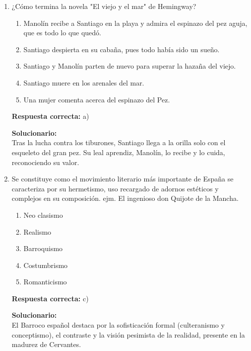 \begin{enumerate}
	\item ¿Cómo termina la novela "El viejo y el mar" de Hemingway?
	\begin{enumerate}[label=\alph*)]
		\item Manolín recibe a Santiago en la playa y admira el espinazo del pez aguja, que es todo lo que quedó.
		\item Santiago despierta en su cabaña, pues todo había sido un sueño.
		\item Santiago y Manolín parten de nuevo para superar la hazaña del viejo.
		\item Santiago muere en los arenales del mar.
		\item Una mujer comenta acerca del espinazo del Pez.
	\end{enumerate}
	\textbf{Respuesta correcta:} a)
	
	\vspace{2mm}
	\textbf{Solucionario:}\\
	Tras la lucha contra los tiburones, Santiago llega a la orilla solo con el esqueleto del gran pez. Su leal aprendiz, Manolín, lo recibe y lo cuida, reconociendo su valor.
	
	\vspace{6mm}
	
	\item Se constituye como el movimiento literario más importante de España se caracteriza por su hermetismo, uso recargado de adornos estéticos y complejos en su composición. ejm. El ingenioso don Quijote de la Mancha.
	\begin{enumerate}[label=\alph*)]
		\item Neo clasismo
		\item Realismo
		\item Barroquismo
		\item Costumbrismo
		\item Romanticismo
	\end{enumerate}
	\textbf{Respuesta correcta:} c)
	
	\vspace{2mm}
	\textbf{Solucionario:}\\
	El Barroco español destaca por la sofisticación formal (culteranismo y conceptismo), el contraste y la visión pesimista de la realidad, presente en la madurez de Cervantes.
	
	\vspace{6mm}
	

\end{enumerate}
